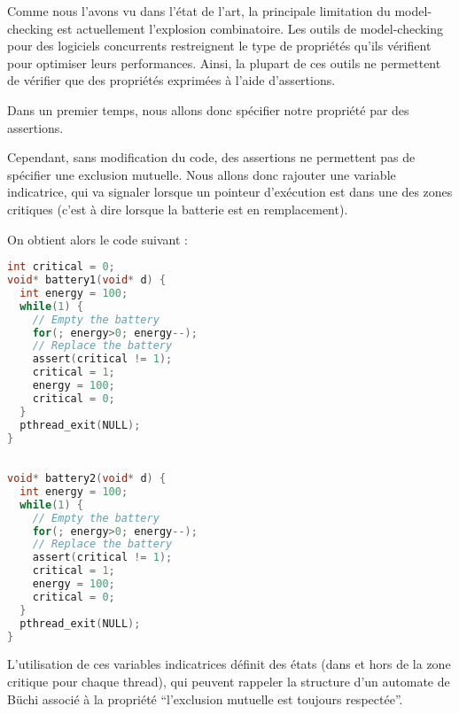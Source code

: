 Comme nous l'avons vu dans l'état de l'art, la principale limitation du
model-checking est actuellement l'explosion combinatoire. Les outils de
model-checking pour des logiciels concurrents restreignent le type de
propriétés qu'ils vérifient pour optimiser leurs performances. Ainsi, la
plupart de ces outils ne permettent de vérifier que des propriétés
exprimées à l'aide d'assertions.

Dans un premier temps, nous allons donc spécifier notre propriété par
des assertions.

Cependant, sans modification du code, des assertions ne permettent pas
de spécifier une exclusion mutuelle. Nous allons donc rajouter une
variable indicatrice, qui va signaler lorsque un pointeur d'exécution
est dans une des zones critiques (c'est à dire lorsque la batterie est
en remplacement).

On obtient alors le code suivant :

\noindent\begin{minipage}{.45\textwidth}
\begin{lstlisting}[language=C, frame=single, caption=Thread 1]
int critical = 0;
void* battery1(void* d) {
  int energy = 100;
  while(1) {
    // Empty the battery
    for(; energy>0; energy--);
    // Replace the battery
    assert(critical != 1);
    critical = 1;
    energy = 100;
    critical = 0;
  }
  pthread_exit(NULL);
}
\end{lstlisting}
\end{minipage}\hfill
\begin{minipage}{.45\textwidth}
\begin{lstlisting}[language=C, frame=single, caption=Thread 2]

void* battery2(void* d) {
  int energy = 100;
  while(1) {
    // Empty the battery
    for(; energy>0; energy--);
    // Replace the battery
    assert(critical != 1);
    critical = 1;
    energy = 100;
    critical = 0;
  }
  pthread_exit(NULL);
}
\end{lstlisting}
\end{minipage}


L'utilisation de ces variables indicatrices définit des états (dans et
hors de la zone critique pour chaque thread), qui peuvent rappeler la
structure d'un automate de Büchi associé à la propriété ``l'exclusion
mutuelle est toujours respectée''.


